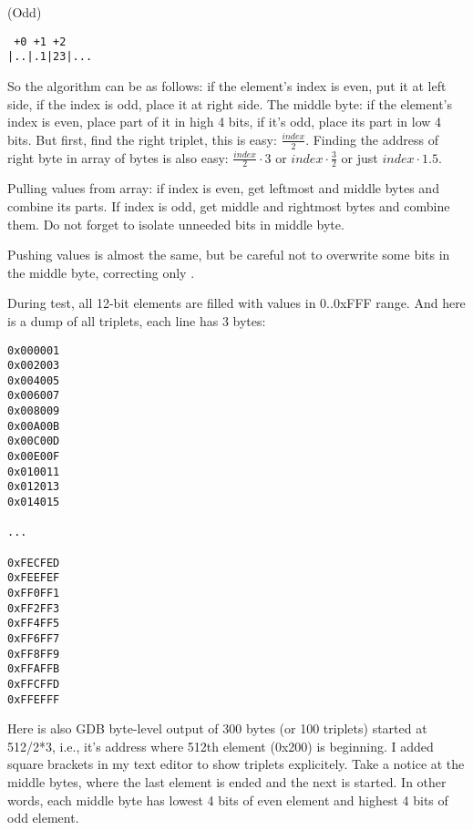 (Odd)

\begin{lstlisting}
 +0 +1 +2
|..|.1|23|...
\end{lstlisting}


So the algorithm can be as follows: if the element's index is even, put it at left side, if the index is odd, place it at right side.
The middle byte: if the element's index is even, place part of it in high 4 bits, if it's odd, place its part in low 4 bits.
But first, find the right triplet, this is easy: $\frac{index}{2}$.
Finding the address of right byte in array of bytes is also easy: $\frac{index}{2} \cdot 3$ or $index \cdot \frac{3}{2}$ or just $index \cdot 1.5$.

Pulling values from array: if index is even, get leftmost and middle bytes and combine its parts.
If index is odd, get middle and rightmost bytes and combine them.
Do not forget to isolate unneeded bits in middle byte.

Pushing values is almost the same, but be careful not to overwrite some  bits in the middle byte, correcting only .




During test, all 12-bit elements are filled with values in 0..0xFFF range.
And here is a dump of all triplets, each line has 3 bytes:

\begin{lstlisting}
0x000001
0x002003
0x004005
0x006007
0x008009
0x00A00B
0x00C00D
0x00E00F
0x010011
0x012013
0x014015

...

0xFECFED
0xFEEFEF
0xFF0FF1
0xFF2FF3
0xFF4FF5
0xFF6FF7
0xFF8FF9
0xFFAFFB
0xFFCFFD
0xFFEFFF
\end{lstlisting}

Here is also GDB byte-level output of 300 bytes (or 100 triplets) started at 512/2*3, i.e., it's address where 512th element (0x200) is beginning.
I added square brackets in my text editor to show triplets explicitely.
Take a notice at the middle bytes, where the last element is ended and the next is started.
In other words, each middle byte has lowest 4 bits of even element and highest 4 bits of odd element.




